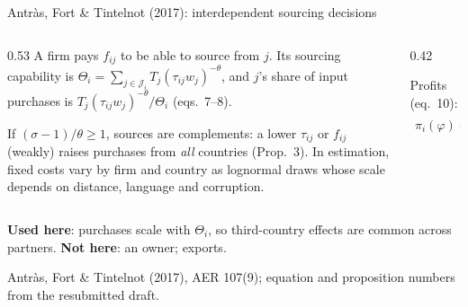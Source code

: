 \documentclass[11pt,aspectratio=169,notes]{beamer}
\newcommand{\src}[1]{\par\vfill{\color{mute}\scriptsize #1\par}}
\begin{document}
\begin{frame}{Antr\`as, Fort \& Tintelnot (2017): interdependent sourcing decisions}
\vspace{0.15cm}
\begin{columns}[T]
\begin{column}{0.53\textwidth}
{\footnotesize A firm pays $f_{ij}$ to be able to source from $j$. Its sourcing capability is $\Theta_i=\sum_{j\in\mathcal J_i}T_j(\tau_{ij}w_j)^{-\theta}$, and $j$'s share of input purchases is $T_j(\tau_{ij}w_j)^{-\theta}/\Theta_i$ (eqs.~7--8).}
\vspace{0.2cm}

{\footnotesize If $(\sigma-1)/\theta\ge1$, sources are complements: a lower $\tau_{ij}$ or $f_{ij}$ (weakly) raises purchases from \emph{all} countries (Prop.~3). In estimation, fixed costs vary by firm and country as lognormal draws whose scale depends on distance, language and corruption.}
\end{column}
\begin{column}{0.42\textwidth}
\begin{mathbox}
\small Profits (eq.~10):
\begin{align*}
\pi_i(\varphi)=&\,\varphi^{\sigma-1}(\gamma\Theta_i)^{\frac{\sigma-1}{\theta}}B_i\\
&-w_i\textstyle\sum_{j\in\mathcal J_i}f_{ij}
\end{align*}
\end{mathbox}
\end{column}
\end{columns}
\vspace{0.15cm}
{\small\textbf{Used here}: purchases scale with $\Theta_i$, so third-country effects are common across partners. \textbf{Not here}: an owner; exports.}
\src{Antr\`as, Fort \& Tintelnot (2017), AER 107(9); equation and proposition numbers from the resubmitted draft.}
\end{frame}
\end{document}

